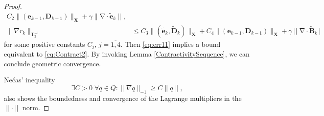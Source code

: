\documentclass[3p]{elsarticle}
\newtheorem{lemma}[theorem]{Lemma}
\def\V#1{\mathbf{#1}}
\def\Vt#1{\mathbf{\tilde{#1}}}
\newcommand{\divergence}{\mathrm{\nabla \cdot}}
\newcommand{\Lbinvmap}{\mathrm{T_2^{-1}}}
\begin{document}
\begin{proof}
\begin{equation}
\begin{aligned}
   C_2 \| (\V{e}_{k-1},\V{D}_{k-1}) \|_{\V{X}}
   + \gamma \| \divergence \Vt{e}_k \|, 
   \\
   \|\nabla r_k\|_{\Lbinvmap} & \le C_3 \| (\Vt{e}_k,\Vt{D}_k) \|_{\V{X}} + 
   C_4 \| (\V{e}_{k-1},\V{D}_{k-1}) \|_{\V{X}}
   + \gamma \| \divergence \Vt{B}_k \,|   
    \end{aligned}
\end{equation}
for some positive constants $C_j$, $j=\overline{1,4}$.
Then \eqref{eq:err11} implies a bound equivalent to \eqref{eq:Contract2}. By invoking Lemma \ref{ContractivitySequence}, we can conclude geometric convergence. 

Ne{\'c}as' inequality
   \begin{equation}
        \label{eq:Necas}
      \exists C > 0 \;  \forall q \in Q: \| \nabla  q \|_{-1} \ge C \| q\|,
    \end{equation}
also shows the boundedness and convergence of the Lagrange multipliers in the $\| \cdot \|$ norm.    
\end{proof}
\end{document}
